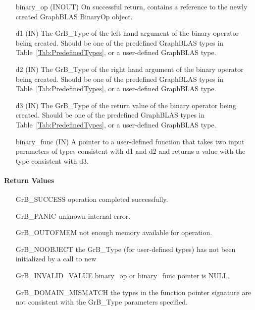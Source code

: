 \begin{itemize}[leftmargin=1.1in]
    \item[{\sf binary\_op}] ({\sf INOUT}) On successful return, contains a 
          reference to the newly created GraphBLAS BinaryOp object.
    \item[{\sf d1}]  ({\sf IN}) The {\sf GrB\_Type} of the left hand 
          argument of the binary operator being created. Should be one of the
          predefined GraphBLAS types in Table~\ref{Tab:PredefinedTypes}, or a
          user-defined GraphBLAS type.
    \item[{\sf d2}]  ({\sf IN}) The {\sf GrB\_Type} of the right hand 
          argument of the binary operator being created. Should be one of the
          predefined GraphBLAS types in Table~\ref{Tab:PredefinedTypes}, or a 
          user-defined GraphBLAS type.
    \item[{\sf d3}]  ({\sf IN}) The {\sf GrB\_Type} of the return
          value of the binary operator being created. Should be one of the
          predefined GraphBLAS types in Table~\ref{Tab:PredefinedTypes}, or a 
          user-defined GraphBLAS type.
    \item[{\sf binary\_func}] ({\sf IN}) A pointer to a user-defined function that 
          takes two input parameters of types consistent with {\sf d1} and 
          {\sf d2} and returns a value with the type consistent with {\sf d3}. 
\end{itemize}

\paragraph{Return Values}

\begin{itemize}[leftmargin=2.1in]
\item[{\sf GrB\_SUCCESS}]           operation completed successfully.
\item[{\sf GrB\_PANIC}]             unknown internal error.
\item[{\sf GrB\_OUTOFMEM}]          not enough memory available for operation.
\item[{\sf GrB\_NOOBJECT}]          the {\sf GrB\_Type} (for user-defined types)
                                    has not been initialized by a call to {\sf new}
\item[{\sf GrB\_INVALID\_VALUE}]    {\sf binary\_op} or {\sf binary\_func} pointer is {\sf NULL}.
\item[{\sf GrB\_DOMAIN\_MISMATCH}]  the types in the function pointer signature are not   
                                    consistent with the {\sf GrB\_Type} parameters specified.
\end{itemize}


